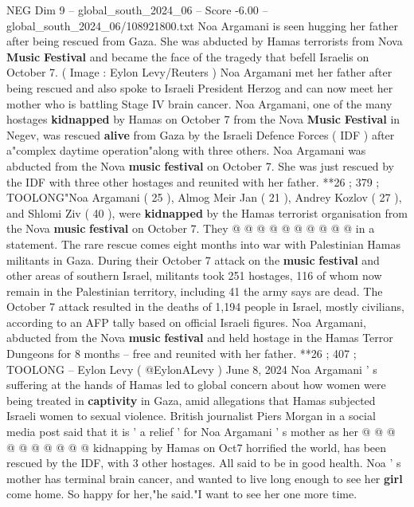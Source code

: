 \begin{textsample}{NEG Dim 9 – global\_south\_2024\_06 – Score -6.00 – global\_south\_2024\_06/108921800.txt}  \label{ex:f9_neg_353}
Noa Argamani is seen hugging her father after being rescued from Gaza.
She was abducted by Hamas terrorists from Nova \textbf{Music} \textbf{Festival} and became the face of the tragedy that befell Israelis on October 7. ( Image : Eylon Levy/Reuters ) Noa Argamani met her father after being rescued and also spoke to Israeli President Herzog and can now meet her mother who is battling Stage IV brain cancer.
Noa Argamani, one of the many hostages \textbf{kidnapped} by Hamas on October 7 from the Nova \textbf{Music} \textbf{Festival} in Negev, was rescued \textbf{alive} from Gaza by the Israeli Defence Forces ( IDF ) after a"complex daytime operation"along with three others.
Noa Argamani was abducted from the Nova \textbf{music} \textbf{festival} on October 7.
She was just rescued by the IDF with three other hostages and reunited with her father. **26 ; 379 ; TOOLONG"Noa Argamani ( 25 ), Almog Meir Jan ( 21 ), Andrey Kozlov ( 27 ), and Shlomi Ziv ( 40 ), were \textbf{kidnapped} by the Hamas terrorist organisation from the Nova \textbf{music} \textbf{festival} on October 7.
They @ @ @ @ @ @ @ @ @ @ in a statement.
The rare rescue comes eight months into war with Palestinian Hamas militants in Gaza.
During their October 7 attack on the \textbf{music} \textbf{festival} and other areas of southern Israel, militants took 251 hostages, 116 of whom now remain in the Palestinian territory, including 41 the army says are dead.
The October 7 attack resulted in the deaths of 1,194 people in Israel, mostly civilians, according to an AFP tally based on official Israeli figures.
Noa Argamani, abducted from the Nova \textbf{music} \textbf{festival} and held hostage in the Hamas Terror Dungeons for 8 months -- free and reunited with her father. **26 ; 407 ; TOOLONG -- Eylon Levy ( @EylonALevy ) June 8, 2024 Noa Argamani ' s suffering at the hands of Hamas led to global concern about how women were being treated in \textbf{captivity} in Gaza, amid allegations that Hamas subjected Israeli women to sexual violence.
British journalist Piers Morgan in a social media post said that it is ' a relief ' for Noa Argamani ' s mother as her @ @ @ @ @ @ @ @ @ @ kidnapping by Hamas on Oct7 horrified the world, has been rescued by the IDF, with 3 other hostages.
All said to be in good health.
Noa ' s mother has terminal brain cancer, and wanted to live long enough to see her \textbf{girl} come home.
So happy for her,"he said."I want to see her one more time.

\end{textsample}
